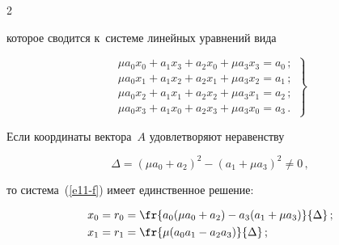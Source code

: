 \begin{multicols}{2}
\begin{equation}
  \end{equation}


  


  \vspace*{-1pt}


  


  \noindent


которое сводится к~системе линейных уравнений вида


\begin{equation}


\left.


\begin{matrix}


\mu a_0 x_0+a_1x_3+a_2x_0+\mu a_3x_3=a_0\,;\\[2pt]


\mu a_0x_1+a_1x_2+a_2x_1+\mu a_3x_2 =a_1\,;\\[2pt]


\mu a_0 x_2+a_1x_1+a_2x_2+\mu a_3 x_1=a_2\,;\\[2pt]


\mu a_0x_3+a_1x_0+a_2x_3+\mu a_3x_0=a_3\,.


\end{matrix}


\right\}


\label{e11-f}


\end{equation}


  


  Если координаты вектора~$A$ удовлетворяют неравенству 


    \begin{equation*}


  \Delta = \left( \mu a_0+a_2\right)^2 -\left( a_1+\mu a_3\right)^2\not= 0\,,




  \end{equation*}


то система~(\ref{e11-f}) имеет единственное решение:





\noindent


\begin{align*}


x_0&=r_0=\fr{a_0(\mu a_0+a_2)-a_3(a_1+\mu a_3)}{\Delta}\,;\\ 


x_1&=r_1=\fr{\mu(a_0a_1-a_2a_3)}{\Delta}\,;\\



\end{align*}
\end{multicols}
